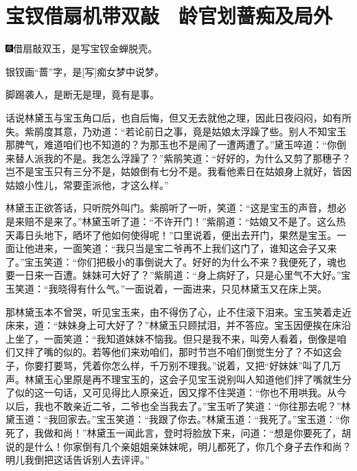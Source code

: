 

\chapter{宝钗借扇机带双敲　龄官划蔷痴及局外}\label{part0034_split_000.htmlux5cux23calibre_pb_0}

{\includegraphics[width=3mm]{../Images/00004}借扇敲双玉，是写宝钗金蝉脱壳。}

{银钗画``蔷''字，是{[}写{]}痴女梦中说梦。}

{脚踢袭人，是断无是理，竟有是事。}

话说林黛玉与宝玉角口后，也自后悔，但又无去就他之理，因此日夜闷闷，如有所失。紫鹃度其意，乃劝道：``若论前日之事，竟是姑娘太浮躁了些。别人不知宝玉那脾气，难道咱们也不知道的？为那玉也不是闹了一遭两遭了。''黛玉啐道：``你倒来替人派我的不是。我怎么浮躁了？''紫鹃笑道：``好好的，为什么又剪了那穗子？岂不是宝玉只有三分不是，姑娘倒有七分不是。我看他素日在姑娘身上就好，皆因姑娘小性儿，常要歪派他，才这么样。''

林黛玉正欲答话，只听院外叫门。紫鹃听了一听，笑道：``这是宝玉的声音，想必是来赔不是来了。''林黛玉听了道：``不许开门！''紫鹃道：``姑娘又不是了。这么热天毒日头地下，晒坏了他如何使得呢！''口里说着，便出去开门，果然是宝玉。一面让他进来，一面笑道：``我只当是宝二爷再不上我们这门了，谁知这会子又来了。''宝玉笑道：``你们把极小的事倒说大了。好好的为什么不来？我便死了，魂也要一日来一百遭。妹妹可大好了？''紫鹃道：``身上病好了，只是心里气不大好。''宝玉笑道：``我晓得有什么气。''一面说着，一面进来，只见林黛玉又在床上哭。

那林黛玉本不曾哭，听见宝玉来，由不得伤了心，止不住滚下泪来。宝玉笑着走近床来，道：``妹妹身上可大好了？''林黛玉只顾拭泪，并不答应。宝玉因便挨在床沿上坐了，一面笑道：``我知道妹妹不恼我。但只是我不来，叫旁人看着，倒像是咱们又拌了嘴的似的。若等他们来劝咱们，那时节岂不咱们倒觉生分了？不如这会子，你要打要骂，凭着你怎么样，千万别不理我。''说着，又把``好妹妹''叫了几万声。林黛玉心里原是再不理宝玉的，这会子见宝玉说别叫人知道他们拌了嘴就生分了似的这一句话，又可见得比人原亲近，因又撑不住哭道：``你也不用哄我。从今以后，我也不敢亲近二爷，二爷也全当我去了。''宝玉听了笑道：``你往那去呢？''林黛玉道：``我回家去。''宝玉笑道：``我跟了你去。''林黛玉道：``我死了。''宝玉道：``你死了，我做和尚！''林黛玉一闻此言，登时将脸放下来，问道：``想是你要死了，胡说的是什么！你家倒有几个亲姐姐亲妹妹呢，明儿都死了，你几个身子去作和尚？明儿我倒把这话告诉别人去评评。''

